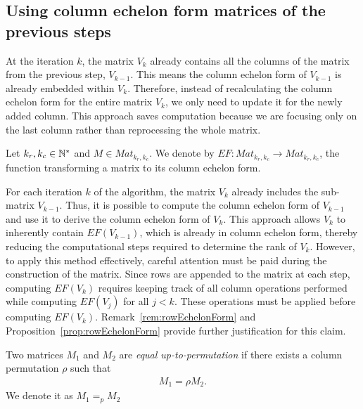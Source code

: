 \documentclass[11pt]{llncs}
\begin{document}
\subsection{Using column echelon form matrices of the previous steps}\label{subsubsection:optEchelonForm}

At the iteration \(k\), the matrix  \(V_k\) already contains all the columns of the matrix from the previous step, \(V_{k-1}\). This means the column echelon form of \(V_{k-1}\) is already embedded within \(V_{k}\). Therefore, instead of recalculating the column echelon form for the entire matrix \(V_{k}\), we only need to update it for the newly added column. This approach saves computation because we are focusing only on the last column rather than reprocessing the whole matrix.

\begin{definition}
    Let $k_r,k_c\in \mathbb{N}^*$ and $M \in Mat_{k_r,k_c}$.
    We denote by $EF: Mat_{k_r,k_c} \rightarrow Mat_{k_r,k_c}$, the function transforming a matrix to its column echelon form.    
\end{definition}


For each iteration \( k \) of the algorithm, the matrix \( V_k \) already includes the sub-matrix \( V_{k-1} \). Thus, it is possible to compute the column echelon form of \( V_{k-1} \) and use it to derive the column echelon form of \( V_k \). 
This approach allows \( V_k \) to inherently contain \( EF(V_{k-1}) \), which is already in column echelon form, thereby reducing the computational steps required to determine the rank of \( V_k \).
However, to apply this method effectively, careful attention must be paid during the construction of the matrix. 
Since rows are appended to the matrix at each step, computing \( EF(V_k) \) requires keeping track of all column operations performed while computing \( EF(V_j) \) for all \( j < k \). 
These operations must be applied before computing \( EF(V_k) \).
Remark~\ref{rem:rowEchelonForm} and Proposition~\ref{prop:rowEchelonForm} provide further justification for this claim.


\begin{definition}
   Two matrices $M_1$ and $M_2$ are \textit{equal up-to-permutation} if there exists a column permutation $\rho$ such that
    \begin{align*}
        M_1 = \rho M_2.
    \end{align*}
    We denote it as $M_1 =_p M_2$
\end{definition}
\end{document}
